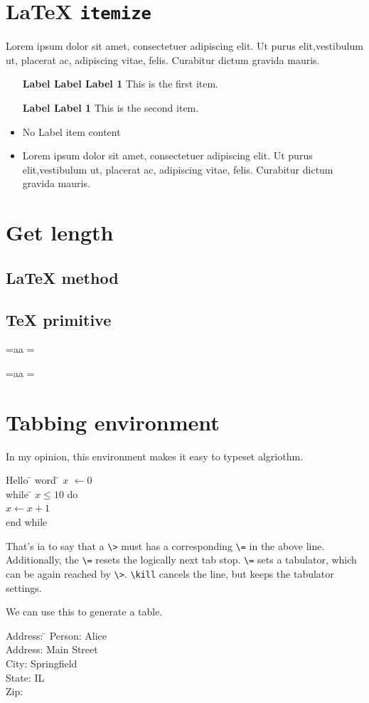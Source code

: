 \documentclass[draft]{article}
\def\text{Lorem ipsum dolor sit amet, consectetuer adipiscing elit.%
Ut purus elit,vestib\-ulum ut, placerat ac, adipiscing vitae, felis. Curabitur dictum gravida%
mauris.}
\begin{document}
\section{\LaTeX{} \texttt{itemize}}
\text
\begin{itemize}
  \item[\textbf{Label Label Label 1}] This is the first item.
  \item[\textbf{Label Label 1}] This is the second item.
  \item No Label item content
  \item \text
\end{itemize}


\section{Get length}
\subsection{LaTeX method}
\begin{verbatim*}
\newlength{\mylen}
\settowidth{\mylen}{aa}
\the\mylen
\end{verbatim*}

\newlength{\mylen}
\settowidth{\mylen}{aa}
\the\mylen



\subsection{TeX primitive}
\begin{verbatim*}
\newdimen\mywidth
{}=\hbox{aa}
\mywidth=
\the\mywidth
\end{verbatim*}


\newdimen\mywidth
{}=\hbox{aa}
\mywidth=
\the\mywidth



\section{Tabbing environment}
In my opinion, this environment makes it easy to typeset algriothm.

\begin{tabbing}
Hello \=\kill
word \=\kill
$x$  $\leftarrow 0$ \\
while \= $x\leq 10$ do \\
      \> $x \leftarrow x+1$ \\
end while 
\end{tabbing}

That's ia to say that a \verb|\>| must has a corresponding \verb|\=| in the above line. Additionally, 
the \verb|\=| resets the logically next tab stop. \verb|\=| sets a tabulator, which can be again reached by \verb|\>|. 
\verb|\kill| cancels the line, but keeps the tabulator settings.


We can use this to generate a table.
\begin{tabbing}
Address: \= \kill
Person: \> Alice \\
Address:  Main Street \\
City: \> Springfield \\
State: \> IL \\
Zip: 
\end{tabbing}
\end{document}
